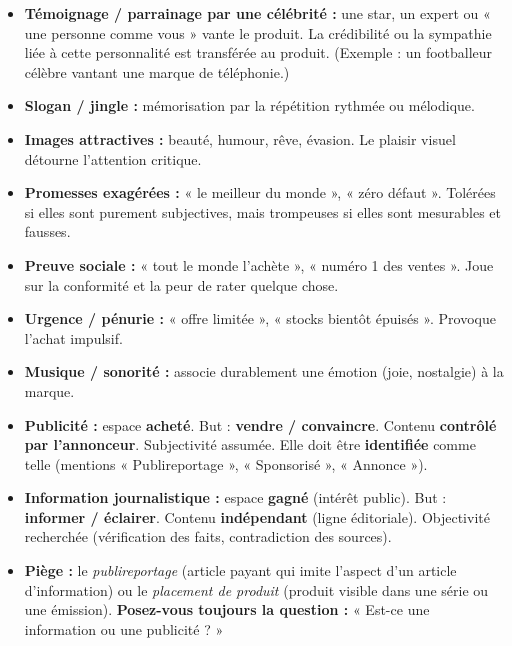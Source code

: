 \documentclass[11pt]{article}
\begin{document}
\begin{aretenir}
\begin{itemize}
    \item \textbf{Témoignage / parrainage par une célébrité :} une star, un expert ou « une personne comme vous » vante le produit. La crédibilité ou la sympathie liée à cette personnalité est transférée au produit. (Exemple : un footballeur célèbre vantant une marque de téléphonie.)
    \item \textbf{Slogan / jingle :} mémorisation par la répétition rythmée ou mélodique.
    \item \textbf{Images attractives :} beauté, humour, rêve, évasion. Le plaisir visuel détourne l'attention critique.
    \item \textbf{Promesses exagérées :} « le meilleur du monde », « zéro défaut ». Tolérées si elles sont purement subjectives, mais trompeuses si elles sont mesurables et fausses.
    \item \textbf{Preuve sociale :} « tout le monde l'achète », « numéro 1 des ventes ». Joue sur la conformité et la peur de rater quelque chose.
    \item \textbf{Urgence / pénurie :} « offre limitée », « stocks bientôt épuisés ». Provoque l'achat impulsif.
    \item \textbf{Musique / sonorité :} associe durablement une émotion (joie, nostalgie) à la marque.
\end{itemize}
\end{aretenir}

\begin{attention}
\begin{itemize}
    \item \textbf{Publicité :} espace \textbf{acheté}. But : \textbf{vendre / convaincre}. Contenu \textbf{contrôlé par l'annonceur}. Subjectivité assumée. Elle doit être \textbf{identifiée} comme telle (mentions « Publireportage », « Sponsorisé », « Annonce »).
    \item \textbf{Information journalistique :} espace \textbf{gagné} (intérêt public). But : \textbf{informer / éclairer}. Contenu \textbf{indépendant} (ligne éditoriale). Objectivité recherchée (vérification des faits, contradiction des sources).
    \item \textbf{Piège :} le \emph{publireportage} (article payant qui imite l'aspect d'un article d'information) ou le \emph{placement de produit} (produit visible dans une série ou une émission). \textbf{Posez-vous toujours la question :} « Est-ce une information ou une publicité ? »
\end{itemize}
\end{attention}
\end{document}
